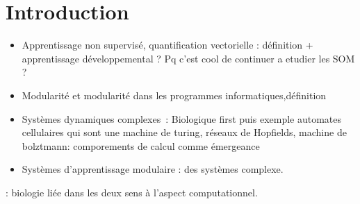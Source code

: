 \section*{Introduction}

\begin{itemize}
    \item Apprentissage non supervisé, quantification vectorielle : définition + apprentissage développemental ? Pq c'est cool de continuer a etudier les SOM ?
    \item Modularité et modularité dans les programmes informatiques,définition
    \item Systèmes dynamiques complexes~: Biologique first puis exemple automates cellulaires qui sont une machine de turing, réseaux de Hopfields, machine de bolztmann: comporements de calcul comme émergeance
    \item Systèmes d'apprentissage modulaire : des systèmes complexe.
\end{itemize}

\cite{Oudeyer2010OnTI} : biologie liée dans les deux sens à l'aspect computationnel.